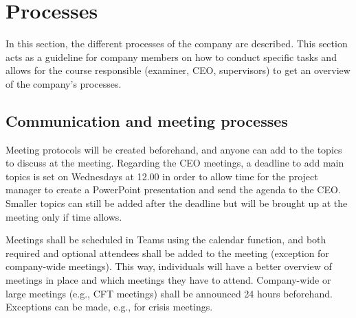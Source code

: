 \section{Processes}
\label{sec:companywide:subsection:cwgeneral}
In this section, the different processes of the company are described. This section acts as a guideline for company members on how to conduct specific tasks and allows for the course responsible (examiner, CEO, supervisors) to get an overview of the company's processes. 



\subsection{Communication and meeting processes}

Meeting protocols will be created beforehand, and anyone can add to the topics to discuss at the meeting. Regarding the CEO meetings, a deadline to add main topics is set on Wednesdays at 12.00 in order to allow time for the project manager to create a PowerPoint presentation and send the agenda to the CEO. Smaller topics can still be added after the deadline but will be brought up at the meeting only if time allows.

Meetings shall be scheduled in Teams using the calendar function, and both required and optional attendees shall be added to the meeting (exception for company-wide meetings). This way, individuals will have a better overview of meetings in place and which meetings they have to attend. Company-wide or large meetings (e.g., CFT meetings) shall be announced 24 hours beforehand. Exceptions can be made, e.g., for crisis meetings. 

